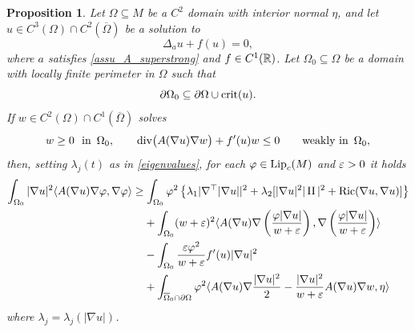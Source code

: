 \documentclass[10 pt,a4paper]{article}
\newtheorem{proposition}[definition]{Proposition}
\theoremstyle{definition}
\begin{document}
\begin{proposition} \label{prop_Poincare_loc}
	Let $\Omega \subseteq M$ be a $C^2$ domain with interior normal $\eta$, and let $u \in C^3(\Omega) \cap C^2(\overline\Omega)$ be a solution to 
	\[
		\Delta_a u + f(u) = 0,
	\]
	where $a$ satisfies \eqref{assu_A_superstrong} and $f \in C^1(\mathbb R)$. Let $\Omega_0\subseteq\Omega$ be a domain with locally finite perimeter in $\Omega$ such that 
	\begin{equation}\label{eq_patialomega0}
	\partial\Omega_0 \subseteq \partial\Omega \cup {\rm crit}(u). 
	\end{equation}
	If $w \in C^2(\Omega) \cap C^1(\overline{\Omega})$ solves
	\begin{equation} \label{poinloc0}
		w \ge 0 \ \ \text{in } \, \Omega_0, \qquad \mathrm{div} \big( A(\nabla u) \nabla w\big) + f'(u)w \le 0 \qquad \text{weakly in } \, \Omega_0,
	\end{equation}
	then, setting $\lambda_j(t)$ as in \eqref{eigenvalues}, for each $\varphi \in \mathrm{Lip}_c(M)$ and $\varepsilon>0$ it holds
	\begin{equation} \label{poinloc}
		\begin{split}
			\int_{\Omega_0} |\nabla u|^2 \langle A(\nabla u)\nabla\varphi,\nabla\varphi\rangle & \geq \int_{\Omega_0} \varphi^2 \left\{ \lambda_1|\nabla^\top|\nabla u||^2 + \lambda_2 [|\nabla u|^2|\operatorname{II}|^2 + \mathrm{Ric}(\nabla u,\nabla u)] \right\} \\
			& \phantom{=\;} + \int_{\Omega_0} (w+\varepsilon)^2 \langle A(\nabla u)\nabla\left(\frac{\varphi|\nabla u|}{w+\varepsilon}\right),\nabla\left(\frac{\varphi|\nabla u|}{w+\varepsilon}\right)\rangle \\
			& \phantom{=\;} - \int_{\Omega_0} \frac{\varepsilon \varphi^2}{w+\varepsilon} f'(u)|\nabla u|^2 \\
			& \phantom{=\;} + \int_{\overline\Omega_0\cap\partial\Omega} \varphi^2 \langle A(\nabla u)\nabla\frac{|\nabla u|^2}{2} - \frac{|\nabla u|^2}{w+\varepsilon} A(\nabla u)\nabla w,\eta\rangle \,
		\end{split}
	\end{equation}
	where $\lambda_j = \lambda_j(|\nabla u|)$.
\end{proposition}
\end{document}
